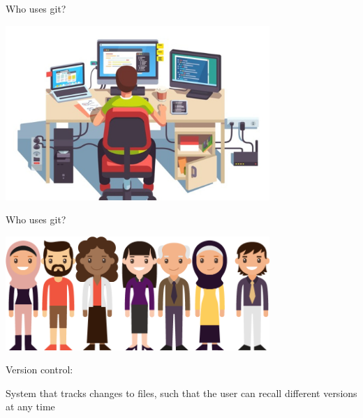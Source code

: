 \documentclass[12pt]{beamer}
\begin{document}
\begin{frame}

	\begin{flushright}
		\Large \textcolor{boss2}{Who uses git?} 
	\end{flushright}
	
	\begin{center}
	  \includegraphics[width=0.75\textwidth]{figs/stereotype.jpg}
	\end{center}

\end{frame}




\begin{frame}

	\begin{flushright}
		\Large \textcolor{boss2}{Who uses git?} 
	\end{flushright}
	
	\begin{center}
	  \includegraphics[width=0.75\textwidth]{figs/everyone.png}
	\end{center}

\end{frame}





\begin{frame}

	\Large \textcolor{boss3}{Version control:} \\

	\bigskip
	
	\textcolor{boss4}{System that tracks changes to files, such that the user can recall different versions at any time}


\end{frame}
\end{document}

